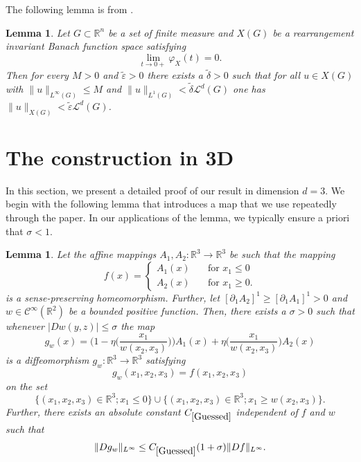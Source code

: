 \documentclass[12pt,a4paper]{amsart}
\theoremstyle{plain}
\newtheorem{lemma}[thm]{Lemma}
\theoremstyle{definition}
\numberwithin{equation}{section}
\def\epsilon{\varepsilon}
\def\er{\mathbb R}
\begin{document}
	The following lemma is from \cite{CGSS}.
	\begin{lemma}\label{Rozumny}
		Let $G\subset\mathbb{R}^n$ be a set of finite measure and $X(G)$ be a rearrangement invariant Banach function space satisfying
		\begin{equation}\label{lim=0}
			\displaystyle{\lim_{t\rightarrow 0+}}\varphi_X(t)=0.
		\end{equation}
		Then for every $M >0$ and $\tilde{\epsilon} > 0$ there exists a $\tilde{\delta}>0$ such that for all $u\in X(G)$ with $\|u\|_{L^{\infty}(G)} \leq M$ and $\|u\|_{L^{1}(G)}<\tilde{\delta}  \mathcal{L}^d(G)$ one has $\|u\|_{X(G)}< \tilde{\epsilon}  \mathcal{L}^d(G)$.
	\end{lemma}
	
	\section{The construction in 3D}\label{Meat}
	In this section, we present a detailed proof of our result in dimension $d=3$. We begin with the following lemma that introduces a map that we use repeatedly through the paper. In our applications of the lemma, we typically ensure a priori that $\sigma <1$. 
	\begin{lemma}\label{FaceLem}
		Let the affine mappings $A_1, A_2 : \mathbb{R}^3 \to \mathbb{R}^3$ be such that the mapping
		$$
		f(x)=\begin{cases}
			A_1(x) \quad &\text{for }x_1\leq0\\
			A_2(x) \quad &\text{for }x_1\geq 0.
		\end{cases}
		$$
		is a sense-preserving homeomorphism. Further, let $[\partial_1 A_2]^1 \geq [\partial_1 A_1]^1>0$ and $w\in \mathcal{C}^{\infty}(\er^2)$ be a bounded positive function. Then, there exists a $\sigma>0$ such that whenever $|Dw(y,z)|\leq \sigma$ the map 
		\begin{equation}\label{defg}
			g_w(x) = \Big(1-\eta\Big(\frac{x_1}{w(x_2,x_3)}\Big)\Big)A_1(x) + \eta\Big(\frac{x_1}{w(x_2,x_3)}\Big)A_2(x)
		\end{equation}
		is a diffeomorphism $g_w: \mathbb{R}^3 \to \mathbb{R}^3$ satisfying 
		\begin{equation}\label{NoChange}
			g_w(x_1,x_2,x_3) = f(x_1,x_2,x_3)
		\end{equation}
		on the set
		$$
		\{(x_1,x_2,x_3)\in \er^3; x_1\leq 0\}\cup \{(x_1,x_2,x_3)\in \er^3; x_1\geq w(x_2,x_3)\}.
		$$
		Further, there exists an absolute constant $C_{\ref{Guessed}}$ independent of $f$ and $w$ such that 
		\begin{equation}\label{Guessed}
			\|Dg_w\|_{L^\infty}\leq C_{\ref{Guessed}}(1+\sigma)\|Df\|_{L^\infty}.
		\end{equation}
	\end{lemma}
\end{document}
